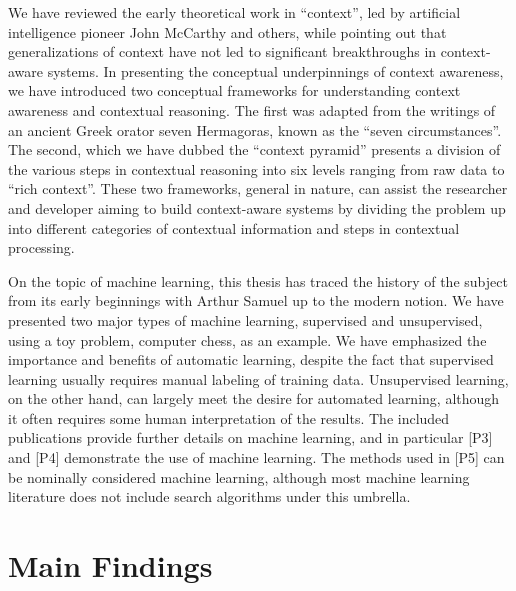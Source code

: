 We have reviewed the early theoretical work in ``context'', led by artificial intelligence pioneer John McCarthy and others, while pointing out that generalizations of context have not led to significant breakthroughs in context-aware systems. In presenting the conceptual underpinnings of context awareness, we have introduced two conceptual frameworks for understanding context awareness and contextual reasoning. The first was adapted from the writings of an ancient Greek orator seven Hermagoras, known as the ``seven circumstances''. The second, which we have dubbed the ``context pyramid'' presents a division of the various steps in contextual reasoning into six levels ranging from raw data to ``rich context''. These two frameworks, general in nature, can assist the researcher and developer aiming to build context-aware systems by dividing the problem up into different categories of contextual information and steps in contextual processing.

On the topic of machine learning, this thesis has traced the history of the subject from its early beginnings with Arthur Samuel up to the modern notion. We have presented two major types of machine learning, supervised and unsupervised, using a toy problem, computer chess, as an example. We have emphasized the importance and benefits of automatic learning, despite the fact that supervised learning usually requires manual labeling of training data. Unsupervised learning, on the other hand, can largely meet the desire for automated learning, although it often requires some human interpretation of the results. The included publications provide further details on machine learning, and in particular [P3] and [P4] demonstrate the use of machine learning. The methods used in [P5] can be nominally considered machine learning, although most machine learning literature does not include search algorithms under this umbrella.

\section{Main Findings}
\label{sec:main_findings}

